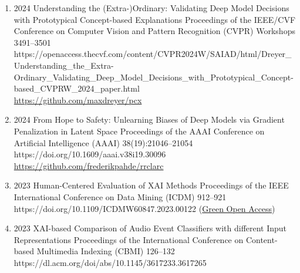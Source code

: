 {\begin{enumerate}
        \item {}
                            {2024}
                            {Understanding the (Extra-)Ordinary: Validating Deep Model Decisions with
                            Prototypical Concept-based Explanations}
                            {Proceedings of the IEEE/CVF Conference on Computer Vision and Pattern Recognition (CVPR) Workshops}
                            {3491--3501}
                            {https://openaccess.thecvf.com/content/CVPR2024W/SAIAD/html/Dreyer_Understanding_the_Extra-Ordinary_Validating_Deep_Model_Decisions_with_Prototypical_Concept-based_CVPRW_2024_paper.html}
                            {\\\href{https://github.com/maxdreyer/pcx}{https://github.com/maxdreyer/pcx}}                                    

        \item {}
                            {2024}
                            {From Hope to Safety: Unlearning Biases of Deep Models via Gradient Penalization in Latent Space}
                            {Proceedings of the AAAI Conference on Artificial Intelligence (AAAI)}
                            {38(19):21046--21054}
                            {https://doi.org/10.1609/aaai.v38i19.30096}
                            {\\\href{https://github.com/frederikpahde/rrclarc}{https://github.com/frederikpahde/rrclarc}}

        \item {}
                            {2023}
                            {Human-Centered Evaluation of XAI Methods}
                            {Proceedings of the IEEE International Conference on Data Mining (ICDM)}
                            {912--921}
                            {https://doi.org/10.1109/ICDMW60847.2023.00122}
                            {(\href{https://arxiv.org/abs/2310.07534}{Green Open Access})}
                   
        \item {}
                            {2023}
                            {XAI-based Comparison of Audio Event Classifiers with different Input Representations}
                            {Proceedings of the International Conference on Content-based Multimedia Indexing (CBMI)}
                            {126--132}
                            {https://dl.acm.org/doi/abs/10.1145/3617233.3617265}



\end{enumerate}}
